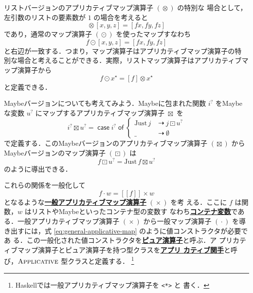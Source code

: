 \documentclass[a5paper,twoside,fleqn,draft]{jsbook}
\def\[{[\![}
\def\]{]\!]}
\newcommand{\programminglanguage}[1]{\textsf{#1}}
\newcommand{\haskell}{\programminglanguage{Haskell}}
\newcommand{\keyword}[1]{{\underline{\textbf{#1}}}}
\newcommand{\code}[1]{\texttt{#1}}
\newcommand{\mKeyword}[1]{\mathsf{#1}}
\newcommand{\mIfKeyword}{\mKeyword{if}}
\newcommand{\mCaseKeyword}{\mKeyword{case}}
\newcommand{\mOfKeyword}{\mKeyword{of}}
\newcommand{\mOtherwiseKeyword}{\mKeyword{otherwise}}
\DeclareMathOperator{\mCaseKW}{\mCaseKeyword}
\DeclareMathOperator{\mIf}{\mIfKeyword}
\DeclareMathOperator{\mOfKW}{\mOfKeyword}
\DeclareMathOperator{\mOtherwise}{\mOtherwiseKeyword}
\newcommand{\mNothing}{\emptyset}
\DeclareMathOperator{\mAppMap}{\times}
\DeclareMathOperator{\mAppMapList}{\otimes}
\DeclareMathOperator{\mAppMapMaybe}{\boxtimes}
\DeclareMathOperator{\mIfSo}{\dashrightarrow}
\DeclareMathOperator{\mLogicalAnd}{\wedge}
\DeclareMathOperator{\mMap}{\cdot}
\DeclareMathOperator{\mMapList}{\odot}
\DeclareMathOperator{\mMapMaybe}{\boxdot}
\newcommand{\mValueConstructor}[1]{\mathrm{#1}}
\newcommand{\mValueWith}[2]{\mValueConstructor{#1}\,#2}
\newcommand{\mJustWith}[1]{\mValueWith{Just}{#1}}
\newcommand{\mPureWith}[1]{\[#1\]}
\newcommand{\mTypeClass}[1]{\textsc{#1}} %
\newcommand{\mApplicativeTypeClass}{\mTypeClass{Applicative}}
\newcommand{\mList}[1]{{#1}^\mathrm{\star}}
\newcommand{\mMaybe}[1]{{#1}^?}
\newcommand{\mCaseOf}[1]{\mCaseKW#1\mOfKW}
\begin{document}
リストバージョンのアプリカティブマップ演算子 $(\mAppMapList)$ の特別な
場合として，左引数のリストの要素数が $1$ の場合を考えると
\begin{equation}
  [f]\mAppMapList{}[x,y,z]
  =[fx,fy,fz]
\end{equation}
であり，通常のマップ演算子 $(\mMapList)$ を使ったマップすなわち
\begin{equation}
  f\mMapList{}[x,y,z]
  =[fx,fy,fz]
\end{equation}
と右辺が一致する．つまり，マップ演算子はアプリカティブマップ演算子の特
別な場合と考えることができる．実際，リストマップ演算子はアプリカティブマップ演算子から
\begin{equation}
  f\mMapList\mList{x}
  =[f]\mAppMapList\mList{x}
\end{equation}
と定義できる．

Maybeバージョンについても考えてみよう．Maybeに包まれた関数 $\mMaybe{i}$
をMaybeな変数 $\mMaybe{u}$ にマップするアプリカティブマップ演算子
$\mAppMapMaybe$ を
\begin{equation}
  \mMaybe{i}\mAppMapMaybe\mMaybe{u}
  =\mCaseOf{\mMaybe{i}}
  \begin{cases}
    \mJustWith{j}
    &\mIfSo j\mMapMaybe\mMaybe{u}\\
    \_
    &\mIfSo\mNothing
  \end{cases}
\end{equation}
で定義する．このMaybeバージョンのアプリカティブマップ演算子
$(\mAppMapMaybe)$ からMaybeバージョンのマップ演算子 $(\mMapMaybe)$ は
\begin{equation}
  f\mMapMaybe\mMaybe{u}
  =\mJustWith{f}\mAppMapMaybe\mMaybe{u}
\end{equation}
のように導出できる．

これらの関係を一般化して
\begin{equation}
  \label{eq:general-applicative-map}
  f\mMap w
  =\mPureWith{f}\mAppMap w
\end{equation}
となるような\keyword{一般アプリカティブマップ演算子} $(\mAppMap)$ を考
える．ここに $f$ は関数，$w$ はリストやMaybeといったコンテナ型の変数す
なわち\keyword{コンテナ変数}である．一般アプリカティブマップ演算子
$(\mAppMap)$ から一般マップ演算子 $(\mMap)$ を導き出すには，式
\eqref{eq:general-applicative-map} のように値コンストラクタが必要であ
る．この一般化された値コンストラクタを\keyword{ピュア演算子}と呼ぶ．ア
プリカティブマップ演算子とピュア演算子を持つ型クラスを\keyword{アプリ
  カティブ関手}と呼び，$\mApplicativeTypeClass$ 型クラスと定義する．
\footnote{\haskell では一般アプリカティブマップ演算子を \code{<*>} と
  書く．}
\end{document}
